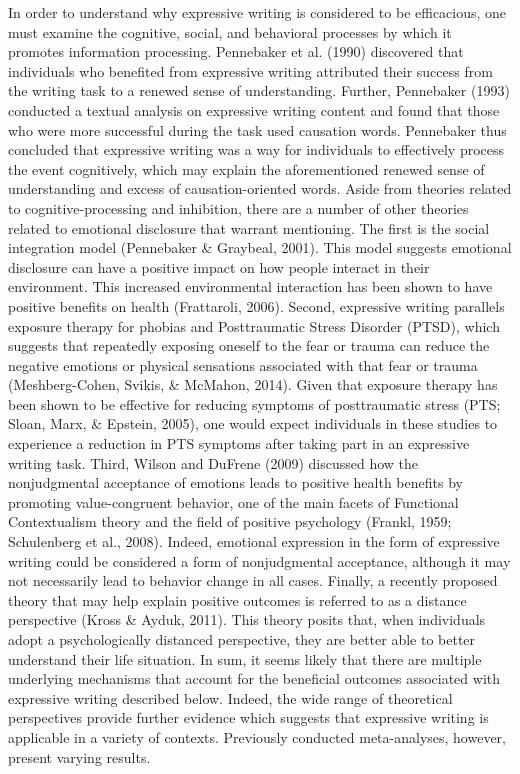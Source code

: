 \documentclass[man, mask]{apa6}
\theoremstyle{definition}
\theoremstyle{definition}
\theoremstyle{definition}
\theoremstyle{remark}
\begin{document}
In order to understand why expressive writing is considered to be
efficacious, one must examine the cognitive, social, and behavioral
processes by which it promotes information processing. Pennebaker et al.
(1990) discovered that individuals who benefited from expressive writing
attributed their success from the writing task to a renewed sense of
understanding. Further, Pennebaker (1993) conducted a textual analysis
on expressive writing content and found that those who were more
successful during the task used causation words. Pennebaker thus
concluded that expressive writing was a way for individuals to
effectively process the event cognitively, which may explain the
aforementioned renewed sense of understanding and excess of
causation-oriented words. Aside from theories related to
cognitive-processing and inhibition, there are a number of other
theories related to emotional disclosure that warrant mentioning. The
first is the social integration model (Pennebaker \& Graybeal, 2001).
This model suggests emotional disclosure can have a positive impact on
how people interact in their environment. This increased environmental
interaction has been shown to have positive benefits on health
(Frattaroli, 2006). Second, expressive writing parallels exposure
therapy for phobias and Posttraumatic Stress Disorder (PTSD), which
suggests that repeatedly exposing oneself to the fear or trauma can
reduce the negative emotions or physical sensations associated with that
fear or trauma (Meshberg-Cohen, Svikis, \& McMahon, 2014). Given that
exposure therapy has been shown to be effective for reducing symptoms of
posttraumatic stress (PTS; Sloan, Marx, \& Epstein, 2005), one would
expect individuals in these studies to experience a reduction in PTS
symptoms after taking part in an expressive writing task. Third, Wilson
and DuFrene (2009) discussed how the nonjudgmental acceptance of
emotions leads to positive health benefits by promoting value-congruent
behavior, one of the main facets of Functional Contextualism theory and
the field of positive psychology (Frankl, 1959; Schulenberg et al.,
2008). Indeed, emotional expression in the form of expressive writing
could be considered a form of nonjudgmental acceptance, although it may
not necessarily lead to behavior change in all cases. Finally, a
recently proposed theory that may help explain positive outcomes is
referred to as a distance perspective (Kross \& Ayduk, 2011). This
theory posits that, when individuals adopt a psychologically distanced
perspective, they are better able to better understand their life
situation. In sum, it seems likely that there are multiple underlying
mechanisms that account for the beneficial outcomes associated with
expressive writing described below. Indeed, the wide range of
theoretical perspectives provide further evidence which suggests that
expressive writing is applicable in a variety of contexts. Previously
conducted meta-analyses, however, present varying results.
\end{document}
